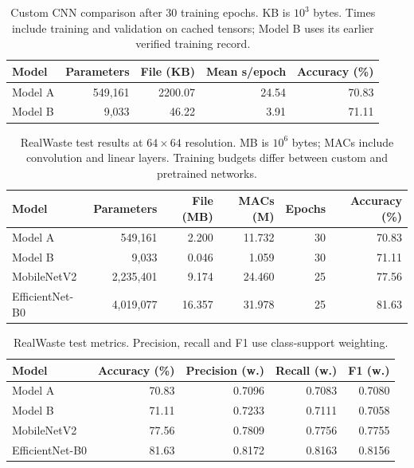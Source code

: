 \begin{table}[htbp]
\centering
\small
\begin{tabular}{lrrrr}
\hline
Model & Parameters & File (KB) & Mean s/epoch & Accuracy (\%) \\
\hline
Model A & 549,161 & 2200.07 & 24.54 & 70.83 \\
Model B & 9,033 & 46.22 & 3.91 & 71.11 \\
\hline
\end{tabular}
\caption{Custom CNN comparison after 30 training epochs. KB is $10^3$ bytes. Times include training and validation on cached tensors; Model B uses its earlier verified training record.}
\label{tab:realwaste-custom}
\end{table}

\begin{table}[htbp]
\centering
\small
\begin{tabular}{lrrrrr}
\hline
Model & Parameters & File (MB) & MACs (M) & Epochs & Accuracy (\%) \\
\hline
Model A & 549,161 & 2.200 & 11.732 & 30 & 70.83 \\
Model B & 9,033 & 0.046 & 1.059 & 30 & 71.11 \\
MobileNetV2 & 2,235,401 & 9.174 & 24.460 & 25 & 77.56 \\
EfficientNet-B0 & 4,019,077 & 16.357 & 31.978 & 25 & 81.63 \\
\hline
\end{tabular}
\caption{RealWaste test results at $64\times64$ resolution. MB is $10^6$ bytes; MACs include convolution and linear layers. Training budgets differ between custom and pretrained networks.}
\label{tab:realwaste-final}
\end{table}

\begin{table}[htbp]
\centering
\small
\begin{tabular}{lrrrr}
\hline
Model & Accuracy (\%) & Precision (w.) & Recall (w.) & F1 (w.) \\
\hline
Model A & 70.83 & 0.7096 & 0.7083 & 0.7080 \\
Model B & 71.11 & 0.7233 & 0.7111 & 0.7058 \\
MobileNetV2 & 77.56 & 0.7809 & 0.7756 & 0.7755 \\
EfficientNet-B0 & 81.63 & 0.8172 & 0.8163 & 0.8156 \\
\hline
\end{tabular}
\caption{RealWaste test metrics. Precision, recall and F1 use class-support weighting.}
\label{tab:realwaste-metrics}
\end{table}

